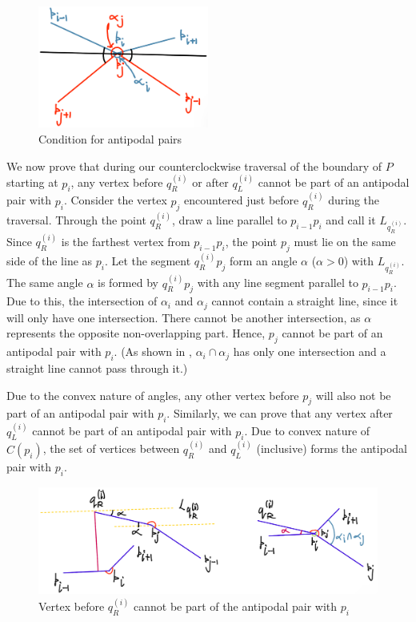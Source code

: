 \documentclass[12pt]{article}
\begin{document}
\begin{figure}[H]
    \centering
    \includegraphics[width=0.5\textwidth]{img/2.jpg}
    \caption{Condition for antipodal pairs}
    \label{fig:2}
\end{figure}

We now prove that during our counterclockwise traversal of the boundary of \( P \) starting at \( p_i \), any vertex before \( q_R^{(i)} \) or after \( q_L^{(i)} \) cannot be part of an antipodal pair with \( p_i \). Consider the vertex \( p_j \) encountered just before \( q_R^{(i)} \) during the traversal. Through the point \( q_R^{(i)} \), draw a line parallel to \( p_{i-1} p_i \) and call it \( L_{q_R^{(i)}} \). Since \( q_R^{(i)} \) is the farthest vertex from \( p_{i-1} p_i \), the point \( p_j \) must lie on the same side of the line as \( p_i \). Let the segment \( q_R^{(i)} p_j \) form an angle \( \alpha \) (\( \alpha > 0 \)) with \( L_{q_R^{(i)}} \). The same angle \( \alpha \) is formed by \( q_R^{(i)} p_j \) with any line segment parallel to \( p_{i-1} p_{i} \). Due to this, the intersection of \( \alpha_i \) and \( \alpha_j \) cannot contain a straight line, since it will only have one intersection. There cannot be another intersection, as \( \alpha \) represents the opposite non-overlapping part. Hence, \( p_j \) cannot be part of an antipodal pair with \( p_i \). (As shown in , \(\alpha_{i} \cap \alpha_j\) has only one intersection and a straight line cannot pass through it.) 

Due to the convex nature of angles, any other vertex before \( p_j \) will also not be part of an antipodal pair with \( p_i \). Similarly, we can prove that any vertex after \( q_L^{(i)} \) cannot be part of an antipodal pair with \( p_i \). Due to convex nature of \(C(p_i)\), the set of vertices between \( q_R^{(i)} \) and \( q_L^{(i)} \) (inclusive) forms the antipodal pair with \( p_i \).

\begin{figure}[H]
    \centering
    \includegraphics[width=1\textwidth]{img/3.jpg}
    \caption{Vertex before \( q_R^{(i)} \) cannot be part of the antipodal pair with \( p_i \)}
    \label{fig:3}
\end{figure}
\end{document}
